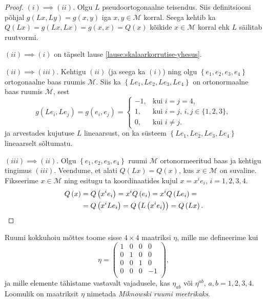 \documentclass[12pt]{article}
\theoremstyle{plain}
\theoremstyle{definition}
\numberwithin{equation}{section}
\def\M{{\mathcal M}}
\begin{document}
\begin{proof}
$(i) \implies (ii)$. Olgu $L$ pseudoortogonaalne teisendus. Siis 
definitsiooni põhjal $g\left(Lx, Ly\right) = g\left(x, y\right)$ iga 
$x, y \in \M$ korral. Seega kehtib ka $Q\left(Lx\right) = 
g\left(Lx, Lx\right) = g\left(x, x\right) = Q\left(x\right)$ 
kõikide $x \in \M$ korral ehk $L$ säilitab ruutvormi.

$(ii) \implies (i)$ on täpselt lause 
\ref{lause:skalaarkorrutise-yhesus}.

$(ii) \implies (iii)$. Kehtigu $(ii)$ (ja seega ka $(i)$) ning 
olgu $\left\lbrace e_1, e_2, e_3, e_4 \right\rbrace$ ortogonaalne 
baas ruumis $\M$. Siis ka $\left\lbrace Le_1, Le_2, Le_3, Le_4 
\right\rbrace$ on ortonormaalne baas ruumis $\M$, sest
\begin{equation*}
g \left(Le_i, Le_j\right) = g\left(e_i, e_j\right) = \begin{cases}
    -1,& \text{kui $i = j = 4$},\\
    1,& \text{kui $i = j$, $i,j \in \{1, 2, 3\}$},\\
    0,& \text{kui $i \neq j$}.
  \end{cases}
\end{equation*}
ja arvestades kujutuse $L$ lineaarsust, on ka süsteem 
$\left\lbrace Le_1, Le_2, Le_3, Le_4 \right\rbrace$ lineaarselt 
sõltumatu.

$(iii) \implies (ii)$. Olgu $\left\lbrace e_1, e_2, e_3, e_4 
\right\rbrace$ ruumi $\M$ ortonormeeritud baas ja kehtigu tingimus 
$(iii)$. Veendume, et alati $Q\left(Lx\right) = Q\left(x\right)$, 
kus $x \in \M$ on suvaline. Fikseerime $x \in \M$ ning esitugu ta 
koordinaatides kujul $x = x^i e_i$, $i = 1, 2, 3, 4$.
\begin{align*}
Q\left(x\right) &= Q\left(x^i e_i\right) = x^i Q\left(e_i\right) = 
x^i Q\left(Le_i\right) = \\
&= Q\left(x^i L e_i\right) = Q\left(L\left(x^i e_i\right)\right) = 
Q\left(Lx\right). \qedhere
\end{align*}
\end{proof}
%
Ruumi kokkuhoiu mõttes toome sisse $4 \times 4$ maatriksi $\eta$, 
mille me defineerime kui
\begin{equation*}
\eta = \begin{pmatrix}
1 & 0 & 0 & 0 \\ 
0 & 1 & 0 & 0 \\  
0 & 0 & 1 & 0 \\ 
0 & 0 & 0 & -1 \\ 
\end{pmatrix},
\end{equation*}
ja mille elemente tähistame vastavalt vajadusele, kas $\eta_{ab}$ või 
$\eta^{ab}$, $a, b = 1, 2, 3, 4$. Loomulik on maatriksit $\eta$ 
nimetada \emph{Miknowski ruumi meetrikaks}.
\end{document}
